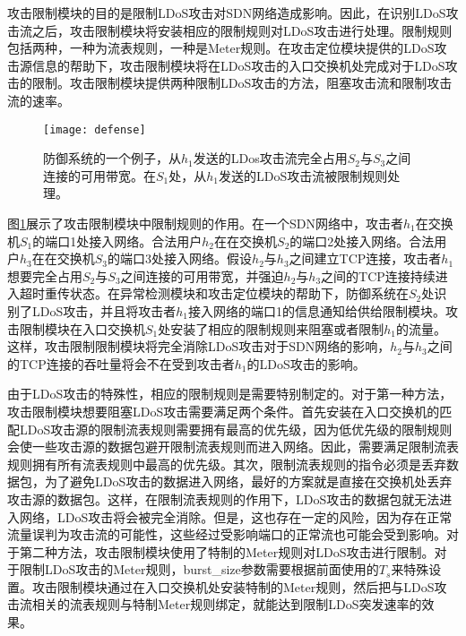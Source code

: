 攻击限制模块的目的是限制LDoS攻击对SDN网络造成影响。因此，在识别LDoS攻击流之后，攻击限制模块将安装相应的限制规则对LDoS攻击进行处理。限制规则包括两种，一种为流表规则，一种是Meter规则。在攻击定位模块提供的LDoS攻击源信息的帮助下，攻击限制模块将在LDoS攻击的入口交换机处完成对于LDoS攻击的限制。攻击限制模块提供两种限制LDoS攻击的方法，阻塞攻击流和限制攻击流的速率。


\begin{figure}
    \centering
    \texttt{[image: defense]}
    \caption{防御系统的一个例子，从$h_1$发送的LDos攻击流完全占用$S_2$与$S_3$之间连接的可用带宽。在$S_1$处，从$h_1$发送的LDoS攻击流被限制规则处理。}
    \label{fig:defense}
\end{figure}

图\ref{fig:defense}展示了攻击限制模块中限制规则的作用。在一个SDN网络中，攻击者$h_1$在交换机$S_1$的端口1处接入网络。合法用户$h_2$在在交换机$S_2$的端口2处接入网络。合法用户$h_3$在在交换机$S_3$的端口3处接入网络。假设$h_2$与$h_3$之间建立TCP连接，攻击者$h_1$想要完全占用$S_2$与$S_3$之间连接的可用带宽，并强迫$h_2$与$h_3$之间的TCP连接持续进入超时重传状态。在异常检测模块和攻击定位模块的帮助下，防御系统在$S_2$处识别了LDoS攻击，并且将攻击者$h_1$接入网络的端口1的信息通知给供给限制模块。攻击限制模块在入口交换机$S_1$处安装了相应的限制规则来阻塞或者限制$h_1$的流量。这样，攻击限制限制模块将完全消除LDoS攻击对于SDN网络的影响，$h_2$与$h_3$之间的TCP连接的吞吐量将会不在受到攻击者$h_1$的LDoS攻击的影响。



由于LDoS攻击的特殊性，相应的限制规则是需要特别制定的。对于第一种方法，攻击限制模块想要阻塞LDoS攻击需要满足两个条件。首先安装在入口交换机的匹配LDoS攻击源的限制流表规则需要拥有最高的优先级，因为低优先级的限制规则会使一些攻击源的数据包避开限制流表规则而进入网络。因此，需要满足限制流表规则拥有所有流表规则中最高的优先级。其次，限制流表规则的指令必须是丢弃数据包，为了避免LDoS攻击的数据进入网络，最好的方案就是直接在交换机处丢弃攻击源的数据包。这样，在限制流表规则的作用下，LDoS攻击的数据包就无法进入网络，LDoS攻击将会被完全消除。但是，这也存在一定的风险，因为存在正常流量误判为攻击流的可能性，这些经过受影响端口的正常流也可能会受到影响。对于第二种方法，攻击限制模块使用了特制的Meter规则对LDoS攻击进行限制。对于限制LDoS攻击的Meter规则，burst\_size参数需要根据前面使用的$T_s$来特殊设置。攻击限制模块通过在入口交换机处安装特制的Meter规则，然后把与LDoS攻击流相关的流表规则与特制Meter规则绑定，就能达到限制LDoS突发速率的效果。

